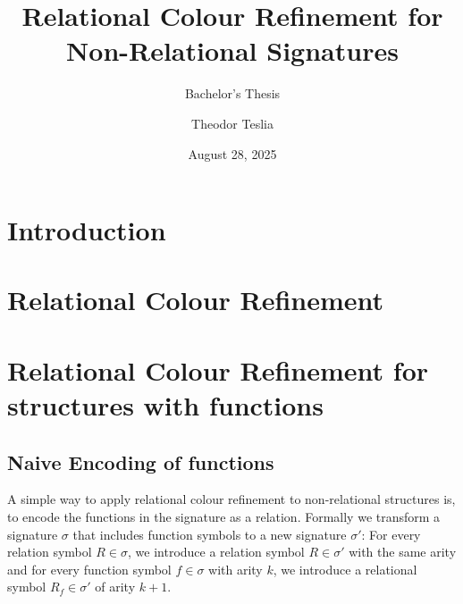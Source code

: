 \documentclass[a4paper,11pt,DIV=15]{scrartcl} %
\theoremstyle{plain}
\theoremstyle{definition}
\begin{document}
\subtitle{Bachelor's Thesis}
\date{August 28, 2025}
\publishers{RWTH Aachen University}	%

\title{Relational Colour Refinement for Non-Relational Signatures}

\author{Theodor Teslia}

\maketitle


\begin{abstract}
\end{abstract}

\thispagestyle{empty}

\clearpage



\section{Introduction}


\section{Relational Colour Refinement}


\section{Relational Colour Refinement for structures with functions}

\subsection{Naive Encoding of functions}

A simple way to apply relational colour refinement to non-relational structures is, to encode the functions in the signature as a relation.
Formally we transform a signature $\sigma$ that includes function symbols to a new signature $\sigma'$: 
For every relation symbol $R\in \sigma$, we introduce a relation symbol $R\in \sigma'$ with the same arity and for every function symbol $f\in\sigma$ with arity $k$, we introduce a relational symbol $R_f\in\sigma'$ of arity $k+1$.
\end{document}
